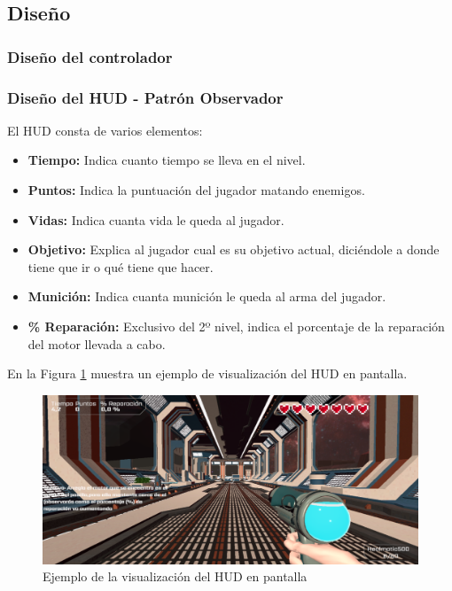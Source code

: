 \subsection{Diseño}

\subsubsection{Diseño del controlador}

\subsubsection{Diseño del HUD - Patrón Observador}
El HUD consta de varios elementos:
\begin{itemize}
	\item \textbf{Tiempo:} Indica cuanto tiempo se lleva en el nivel.
	\item \textbf{Puntos:} Indica la puntuación del jugador matando enemigos.
	\item \textbf{Vidas:} Indica cuanta vida le queda al jugador.
	\item \textbf{Objetivo:} Explica al jugador cual es su objetivo actual, diciéndole a donde tiene que ir o qué tiene que hacer.
	\item \textbf{Munición:} Indica cuanta munición le queda al arma del jugador.
	\item \textbf{\% Reparación:} Exclusivo del 2º nivel, indica el porcentaje de la reparación del motor llevada a cabo.
\end{itemize}

En la Figura \ref{fig:PantallaHUD3D} muestra un ejemplo de visualización del HUD en pantalla.

\begin{figure}[H]
	\centering
	\includegraphics[scale=0.45]{imagenes/PantallaHUD3D.png}
	\caption{\label{fig:PantallaHUD3D}Ejemplo de la visualización del HUD en pantalla}
\end{figure}

